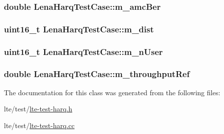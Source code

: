 \subsubsection[{\texorpdfstring{m\+\_\+amc\+Ber}{m_amcBer}}]{\setlength{\rightskip}{0pt plus 5cm}double Lena\+Harq\+Test\+Case\+::m\+\_\+amc\+Ber\hspace{0.3cm}{\ttfamily [private]}}\hypertarget{classLenaHarqTestCase_adbc2a162861957d9858e16556c0988fe}{}\label{classLenaHarqTestCase_adbc2a162861957d9858e16556c0988fe}
\subsubsection[{\texorpdfstring{m\+\_\+dist}{m_dist}}]{\setlength{\rightskip}{0pt plus 5cm}uint16\+\_\+t Lena\+Harq\+Test\+Case\+::m\+\_\+dist\hspace{0.3cm}{\ttfamily [private]}}\hypertarget{classLenaHarqTestCase_a5663ec9ff3b57db57555bedee9b6544c}{}\label{classLenaHarqTestCase_a5663ec9ff3b57db57555bedee9b6544c}
\subsubsection[{\texorpdfstring{m\+\_\+n\+User}{m_nUser}}]{\setlength{\rightskip}{0pt plus 5cm}uint16\+\_\+t Lena\+Harq\+Test\+Case\+::m\+\_\+n\+User\hspace{0.3cm}{\ttfamily [private]}}\hypertarget{classLenaHarqTestCase_a63345f1ba9ffc5ab5e8a01ca79d6f0c4}{}\label{classLenaHarqTestCase_a63345f1ba9ffc5ab5e8a01ca79d6f0c4}
\subsubsection[{\texorpdfstring{m\+\_\+throughput\+Ref}{m_throughputRef}}]{\setlength{\rightskip}{0pt plus 5cm}double Lena\+Harq\+Test\+Case\+::m\+\_\+throughput\+Ref\hspace{0.3cm}{\ttfamily [private]}}\hypertarget{classLenaHarqTestCase_a041c5b33791e34cdfa46c79235f6ac77}{}\label{classLenaHarqTestCase_a041c5b33791e34cdfa46c79235f6ac77}


The documentation for this class was generated from the following files\+:\begin{DoxyCompactItemize}
\item 
lte/test/\hyperlink{lte-test-harq_8h}{lte-\/test-\/harq.\+h}\item 
lte/test/\hyperlink{lte-test-harq_8cc}{lte-\/test-\/harq.\+cc}\end{DoxyCompactItemize}
